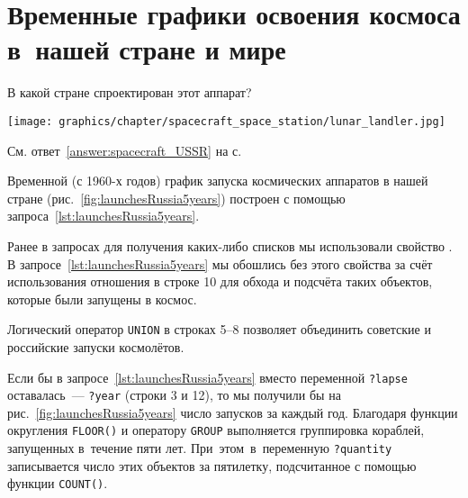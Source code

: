 \section{Временные графики освоения космоса в~нашей стране и мире}


\begin{marginfigure}[0\baselineskip]
    \MarginQuestion
    В какой стране спроектирован этот аппарат?

    \vspace{3pt}
	\texttt{[image: graphics/chapter/spacecraft\_space\_station/lunar\_landler.jpg]}

    См. ответ~\ref{answer:spacecraft_USSR} на с.~\pageref{answer:spacecraft_USSR}\\
    \label{question:spacecraft_lunar}
\end{marginfigure}


Временной (с 1960-х годов) 
график запуска космических аппаратов в нашей стране (рис.~\ref{fig:launchesRussia5years}) 
построен с помощью запроса~\ref{lst:launchesRussia5years}.%

Ранее в запросах для получения каких-либо списков мы использовали свойство . 
В запросе~\ref{lst:launchesRussia5years} мы обошлись без этого свойства за счёт использования отношения 
 в строке 10 
для обхода и подсчёта таких объектов, которые были запущены в космос.  

Логический оператор \lstinline|UNION| в строках 5--8 
позволяет объединить советские и российские запуски космолётов. 

Если бы в запросе~\ref{lst:launchesRussia5years} 
вместо переменной \lstinline|?lapse| оставалась~--- \lstinline|?year| (строки 3 и 12), 
то мы получили бы на рис.~\ref{fig:launchesRussia5years} 
число запусков за каждый год. 
Благодаря функции округления \mbox{\lstinline|FLOOR()|} 
и оператору \lstinline|GROUP| выполняется группировка%
%
 кораблей, запущенных в~течение пяти лет. 
При~этом~в~переменную \lstinline|?quantity| записывается число этих объектов за пятилетку, 
подсчитанное с помощью функции \lstinline|COUNT()|.

